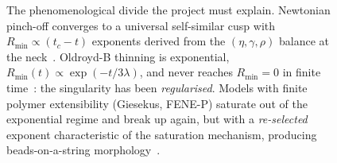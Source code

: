 \documentclass[11pt]{article}
\begin{document}
\begin{figure}[H]
    \begin{center}
        \caption{The phenomenological divide the project must explain. Newtonian pinch-off converges to a universal self-similar cusp with $R_{\min} \propto (t_c-t)$ exponents derived from the $(\eta, \gamma, \rho)$ balance at the neck~\citep{eggers1993universalPinchOff,eggers2015singularities}. Oldroyd-B thinning is exponential, $R_{\min}(t) \propto \exp(-t/3\lambda)$, and never reaches $R_{\min} = 0$ in finite time~\citep{entovHinch1997}: the singularity has been \emph{regularised}. Models with finite polymer extensibility (Giesekus, FENE-P) saturate out of the exponential regime and break up again, but with a \emph{re-selected} exponent characteristic of the saturation mechanism, producing beads-on-a-string morphology~\citep{bhat2010beads}.}
        \label{fig:newtonian-vs-viscoelastic}
    \end{center}
\end{figure}
\end{document}
